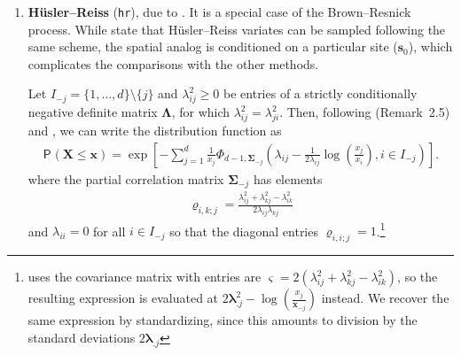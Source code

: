 \documentclass{article}\usepackage[]{graphicx}\usepackage[]{xcolor}
\newcommand{\bs}[1]{\boldsymbol {#1}}
\renewcommand{\P}[2][]{{\mathsf P}_{#1}\left(#2\right)}
\newcommand{\code}[1]{\texttt{#1}}
\newcommand{\pfrac}[2]{\left(\frac{#1}{#2}\right)}
\begin{document}
\begin{enumerate}
\item \textbf{H\"usler--Reiss} (\code{hr}), due to \cite{Husler:1989}. It is a special case of the Brown--Resnick process.
While \cite{Engelke:2015} state that H\"usler--Reiss variates can be sampled following the same scheme, the spatial analog is
conditioned on a particular site ($\bs{s}_0$), which complicates the comparisons with the other methods.

Let $I_{-j}=\{1, \ldots, d\} \setminus \{j\}$ and $\lambda_{ij}^2 \geq 0$ be entries of a strictly conditionally
negative definite matrix $\bs{\Lambda}$, for which $\lambda_{ij}^2=\lambda_{ji}^2$. Then, following \cite{Nikoloulopoulos:2009}
(Remark~2.5) and \cite{Huser:2013}, we can write the distribution function as
 \begin{align*}
   \P{\bs{X} \leq \bs{x}} = \exp \left[ -\sum_{j=1}^d \frac{1}{x_j} \Phi_{d-1, \bs{\Sigma}_{-j}} \left( \lambda_{ij}-
\frac{1}{2\lambda_{ij}}  \log\pfrac{x_j}{x_i}, i \in I_{-j}\right)\right].
                  \end{align*}
                  where the partial correlation matrix $\bs{\Sigma}_{-j}$ has elements
                  \begin{align*}
                     \varrho_{i,k; j}= \frac{\lambda_{ij}^2+\lambda_{kj}^2-\lambda_{ik}^2}{2\lambda_{ij}\lambda_{kj}}
                  \end{align*}
and $\lambda_{ii}=0$ for all $i \in I_{-j}$ so that the diagonal entries $\varrho_{i,i; j}=1$.\footnote{\cite{Engelke:2015}
uses the covariance matrix with entries are $\varsigma=2(\lambda_{ij}^2+\lambda_{kj}^2-\lambda_{ik}^2)$, so the resulting
expression is evaluated at $2\bs{\lambda}_{.j}^2-\log\pfrac{x_j}{\bs{x}_{-j}}$ instead. We recover the same expression by
standardizing, since this amounts to division by the standard deviations $2\bs{\lambda}_{.j}$}




\end{enumerate}
\end{document}
